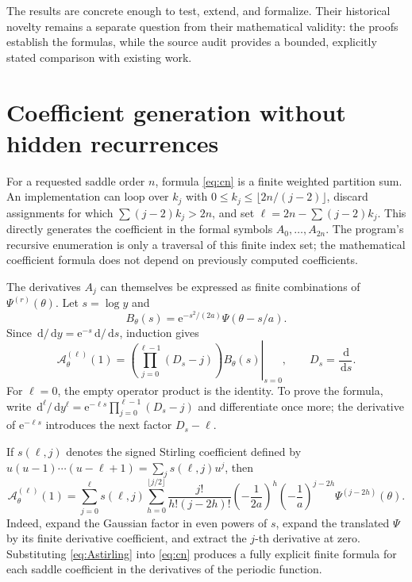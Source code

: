\documentclass[11pt,oneside]{article}
\numberwithin{equation}{section}
\theoremstyle{definition}
\theoremstyle{remark}
\newcommand{\dd}{\,\mathrm d}
\newcommand{\e}{\mathrm e}
\begin{document}
The results are concrete enough to test, extend, and formalize. Their historical
novelty remains a separate question from their mathematical validity: the
proofs establish the formulas, while the source audit provides a bounded,
explicitly stated comparison with existing work.

\appendix
\section{Coefficient generation without hidden recurrences}
\label{app:coefficients}

For a requested saddle order \(n\), formula \eqref{eq:cn} is a finite weighted
partition sum. An implementation can loop over \(k_j\) with
\(0\le k_j\le\lfloor2n/(j-2)\rfloor\), discard assignments for which
\(\sum(j-2)k_j>2n\), and set
\(\ell=2n-\sum(j-2)k_j\). This directly generates the coefficient in the
formal symbols \(A_0,\ldots,A_{2n}\). The program's recursive enumeration is
only a traversal of this finite index set; the mathematical coefficient formula
does not depend on previously computed coefficients.

The derivatives \(A_j\) can themselves be expressed as finite combinations of
\(\Psi^{(r)}(\theta)\). Let \(s=\log y\) and
\[
 B_\theta(s)=\e^{-s^2/(2a)}\Psi(\theta-s/a).
\]
Since \(\dd/\dd y=\e^{-s}\dd/\dd s\), induction gives
\begin{equation}
 \mathcal A_\theta^{(\ell)}(1)
 =\left.\left(\prod_{j=0}^{\ell-1}(D_s-j)\right)
                            B_\theta(s)\right|_{s=0},
 \qquad D_s=\frac{\dd}{\dd s}.
 \label{eq:Aoperator}
\end{equation}
For \(\ell=0\), the empty operator product is the identity. To prove the
formula, write
\(\dd^\ell/\dd y^\ell=\e^{-\ell s}\prod_{j=0}^{\ell-1}(D_s-j)\)
and differentiate once more; the derivative of \(\e^{-\ell s}\) introduces
the next factor \(D_s-\ell\).

If \(s(\ell,j)\) denotes the signed Stirling coefficient defined by
\(u(u-1)\cdots(u-\ell+1)=\sum_js(\ell,j)u^j\), then
\begin{equation}
 \mathcal A_\theta^{(\ell)}(1)
 =\sum_{j=0}^{\ell}s(\ell,j)
   \sum_{h=0}^{\lfloor j/2\rfloor}
       \frac{j!}{h!(j-2h)!}
       \left(-\frac1{2a}\right)^h
       \left(-\frac1a\right)^{j-2h}
       \Psi^{(j-2h)}(\theta).
 \label{eq:Astirling}
\end{equation}
Indeed, expand the Gaussian factor in even powers of \(s\), expand the
translated \(\Psi\) by its finite derivative coefficient, and extract the
\(j\)-th derivative at zero. Substituting \eqref{eq:Astirling} into
\eqref{eq:cn} produces a fully explicit finite formula for each saddle
coefficient in the derivatives of the periodic function.
\end{document}
